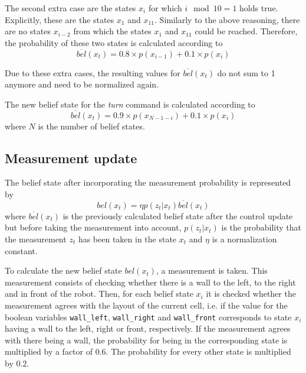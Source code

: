 \documentclass[10pt,a4paper]{article}
\begin{document}
		The second extra case are the states $x_i$ for which $i \mod{10}=1$ holds true. Explicitly, these are the states $x_1$ and $x_{11}$. Similarly to the above reasoning, there are no states $x_{i-2}$ from which the states $x_1$ and $x_{11}$ could be reached. Therefore, the probability of these two states is calculated according to		
		\begin{displaymath}
			\overline{bel}(x_t) = 0.8\times p(x_{i-1}) + 0.1\times p(x_i)
		\end{displaymath}
		
		Due to these extra cases, the resulting values for $\overline{bel}(x_t)$ do not sum to 1 anymore and need to be normalized again.
		
		The new belief state for the \textit{turn} command is calculated according to		
		\begin{displaymath}
			\overline{bel}(x_t) = 0.9\times p(x_{N-1-i}) + 0.1\times p(x_i)
		\end{displaymath}
		where $N$ is the number of belief states.
		
		\subsection{Measurement update}
		The belief state after incorporating the measurement probability is represented by
		\begin{displaymath}
			bel(x_t)=\eta p(z_t|x_t)\overline{bel}(x_t)
		\end{displaymath}
		where $\overline{bel}(x_t)$ is the previously calculated belief state after the control update but before taking the measurement into account, $p(z_t|x_t)$ is the probability that the measurement $z_t$ has been taken in the state $x_t$ and $\eta$ is a normalization constant.
		
		To calculate the new belief state $bel(x_t)$, a measurement is taken. This measurement consists of checking whether there is a wall to the left, to the right and in front of the robot. Then, for each belief state $x_i$ it is checked whether the measurement agrees with the layout of the current cell, i.e. if the value for the boolean variables \verb|wall_left|, \verb|wall_right| and \verb|wall_front| corresponds to state $x_i$ having a wall to the left, right or front, respectively. If the measurement agrees with there being a wall, the probability for being in the corresponding state is multiplied by a factor of $0.6$. The probability for every other state is multiplied by $0.2$.
		
\end{document}
